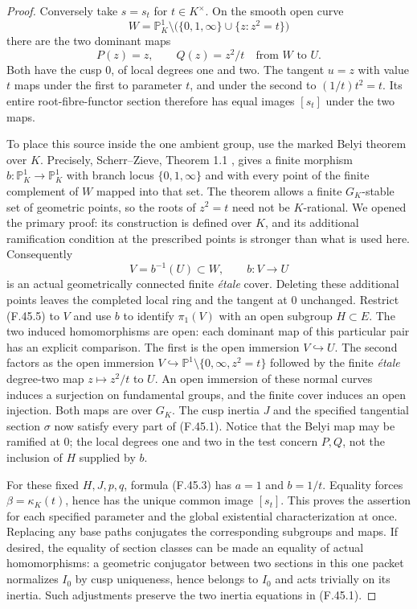 \begin{proof}
Conversely take $s=s_t$ for $t\in K^\times$. On the smooth open
curve
\[
 W=\mathbb P^1_K\setminus
       \bigl(\{0,1,\infty\}\cup\{z:z^2=t\}\bigr)
\]
there are the two dominant maps
\[
               P(z)=z,\qquad Q(z)=z^2/t
                       \quad\text{from }W\text{ to }U.
 \tag{F.45.5}
\]
Both have the cusp $0$, of local degrees one and two. The tangent
$u=z$ with value $t$ maps under the first to parameter $t$, and
under the second to $(1/t)t^2=t$. Its entire root-fibre-functor
section therefore has equal images $[s_t]$ under the two maps.

To place this source inside the one ambient group, use the marked
Belyi theorem over $K$. Precisely, Scherr--Zieve, Theorem 1.1
\cite{F-ScherrZieve}, gives a finite morphism
$b:\mathbb P^1_K\to\mathbb P^1_K$ with branch locus
$\{0,1,\infty\}$ and with every point of the finite complement
of $W$ mapped into that set. The theorem allows a finite
$G_K$-stable set of geometric points, so the roots of $z^2=t$
need not be $K$-rational. We opened the primary proof: its
construction is defined over $K$, and its additional ramification
condition at the prescribed points is stronger than what is
used here. Consequently
\[
 V=b^{-1}(U)\subset W,\qquad b:V\longrightarrow U
 \tag{F.45.6}
\]
is an actual geometrically connected finite \emph{\'etale} cover.
Deleting these additional points leaves the completed local ring
and the tangent at $0$ unchanged. Restrict (F.45.5) to $V$ and
use $b$ to identify $\pi_1(V)$ with an open subgroup $H\subset E$.
The two induced homomorphisms are open: each dominant map of
this particular pair has an explicit comparison. The first is
the open immersion $V\hookrightarrow U$. The second factors as
the open immersion
$V\hookrightarrow\mathbb P^1\setminus\{0,\infty,z^2=t\}$
followed by the finite \emph{\'etale} degree-two map $z\mapsto z^2/t$
to $U$. An open immersion of these normal curves induces a
surjection on fundamental groups, and the finite cover induces
an open injection. Both maps are over $G_K$. The cusp inertia $J$ and
the specified tangential section $\sigma$ now satisfy every part
of (F.45.1). Notice that the Belyi map may be ramified at $0$;
the local degrees one and two in the test concern $P,Q$, not
the inclusion of $H$ supplied by $b$.

For these fixed $H,J,p,q$, formula (F.45.3) has $a=1$ and
$b=1/t$. Equality forces $\beta=\kappa_K(t)$, hence has the
unique common image $[s_t]$. This proves the assertion for each
specified parameter and the global existential characterization
at once. Replacing any base paths conjugates the corresponding
subgroups and maps. If desired, the equality of section classes
can be made an equality of actual homomorphisms: a geometric
conjugator between two sections in this one packet normalizes
$I_0$ by cusp uniqueness, hence belongs to $I_0$ and acts
trivially on its inertia. Such adjustments preserve the two
inertia equations in (F.45.1).


\end{proof}

